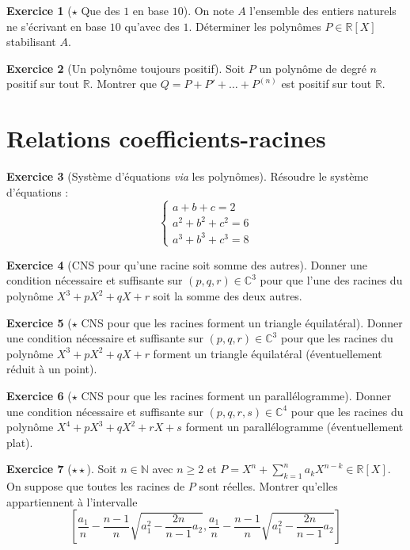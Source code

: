 \documentclass[french]{book}
\newcommand{\N}{\mathbb{N}}
\newcommand{\R}{\mathbb{R}}
\newcommand{\C}{\mathbb{C}}
\theoremstyle{definition}
\newtheorem{ex}{Exercice}[chapter]
\theoremstyle{theorem}
\theoremstyle{remark}
\begin{document}
\begin{ex}[$\star$ Que des $1$ en base $10$]
	On note $A$ l'ensemble des entiers naturels ne s'écrivant en base $10$ qu'avec des $1$. Déterminer les polynômes $P\in\R[X]$ stabilisant $A$.
\end{ex}

\begin{ex}[Un polynôme toujours positif]
	Soit $P$ un polynôme de degré $n$ positif sur tout $\R$. Montrer que $Q=P+P'+\ldots+P^{(n)}$ est positif sur tout $\R$. 
\end{ex}

\section{Relations coefficients-racines}

\begin{ex}[Système d'équations \textit{via} les polynômes]
	Résoudre le système d'équations : $$\begin{cases}
		a+b+c=2 \\
		a^2+b^2+c^2=6 \\
		a^3+b^3+c^3=8
	\end{cases}$$
\end{ex}

\begin{ex}[CNS pour qu'une racine soit somme des autres]
	Donner une condition nécessaire et suffisante sur $(p,q,r)\in\C^3$ pour que l'une des racines du polynôme $X^3+pX^2+qX+r$ soit la somme des deux autres.
\end{ex}

\begin{ex}[$\star$ CNS pour que les racines forment un triangle équilatéral]
	Donner une condition nécessaire et suffisante sur $(p,q,r)\in\C^3$ pour que les racines du polynôme $X^3+pX^2+qX+r$ forment un triangle équilatéral (éventuellement réduit à un point).
\end{ex}

\begin{ex}[$\star$ CNS pour que les racines forment un parallélogramme]
	Donner une condition nécessaire et suffisante sur $(p,q,r,s)\in\C^4$ pour que les racines du polynôme $X^4+pX^3+qX^2+rX+s$ forment un parallélogramme (éventuellement plat).
\end{ex}

\begin{ex}[$\star\star$]
	Soit $n\in\N$ avec $n\geqslant 2$ et $P=\displaystyle X^n+\sum_{k=1}^{n}a_kX^{n-k}\in\R[X]$. On suppose que toutes les racines de $P$ sont réelles. Montrer qu'elles appartiennent à l'intervalle $$\left[\frac{a_1}{n}-\frac{n-1}{n}\sqrt{a_1^2-\frac{2n}{n-1}a_2},\frac{a_1}{n}-\frac{n-1}{n}\sqrt{a_1^2-\frac{2n}{n-1}a_2}\right]$$
\end{ex}
\end{document}
